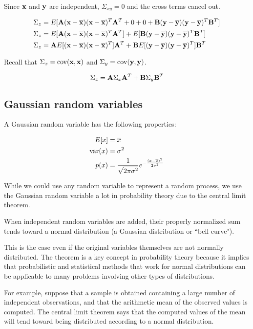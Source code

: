 Since $\mathbf{x}$ and $\mathbf{y}$ are independent, $\Sigma_{xy} = 0$ and the cross
terms cancel out.

\begin{align*}
  \Sigma_z &= E[
    \mathbf{A}(\mathbf{x} - \overline{\mathbf{x}})(\mathbf{x} - \overline{\mathbf{x}})^T\mathbf{A}^T + 0 + 0 +
    \mathbf{B}(\mathbf{y} - \overline{\mathbf{y}})(\mathbf{y} - \overline{\mathbf{y}})^T\mathbf{B}^T] \\
  \Sigma_z &=
    E[\mathbf{A}(\mathbf{x} - \overline{\mathbf{x}})(\mathbf{x} - \overline{\mathbf{x}})^T\mathbf{A}^T] +
    E[\mathbf{B}(\mathbf{y} - \overline{\mathbf{y}})(\mathbf{y} - \overline{\mathbf{y}})^T\mathbf{B}^T] \\
  \Sigma_z &=
    \mathbf{A}E[(\mathbf{x} - \overline{\mathbf{x}})(\mathbf{x} - \overline{\mathbf{x}})^T]\mathbf{A}^T +
    \mathbf{B}E[(\mathbf{y} - \overline{\mathbf{y}})(\mathbf{y} - \overline{\mathbf{y}})^T]\mathbf{B}^T
\end{align*}

Recall that $\Sigma_x = \operatorname{cov}(\mathbf{x}, \mathbf{x})$ and
$\Sigma_y = \operatorname{cov}(\mathbf{y}, \mathbf{y})$.

\begin{equation*}
  \Sigma_z = \mathbf{A}\Sigma_x\mathbf{A}^T + \mathbf{B}\Sigma_y\mathbf{B}^T
\end{equation*}

\subsection{Gaussian random variables}

A Gaussian random variable has the following properties:

\begin{align*}
  E[x] &= \overline{x} \\
  \operatorname{var}(x) &= \sigma^2 \\
  p(x) &= \frac{1}{\sqrt{2\pi\sigma^2}}
    e^{-\frac{(x - \overline{x})^2}{2\sigma^2}}
\end{align*}

While we could use any random variable to represent a random process, we use the
Gaussian random variable a lot in probability theory due to the central limit
theorem.

\begin{definition}
  When independent random variables are added, their properly normalized sum
  tends toward a normal distribution (a Gaussian distribution or ``bell curve").
\end{definition}

This is the case even if the original variables themselves are not normally
distributed. The theorem is a key concept in probability theory because it
implies that probabilistic and statistical methods that work for normal
distributions can be applicable to many problems involving other types of
distributions.

For example, suppose that a sample is obtained containing a large number of
independent observations, and that the arithmetic mean of the observed values
is computed. The central limit theorem says that the computed values of the
mean will tend toward being distributed according to a normal distribution.
